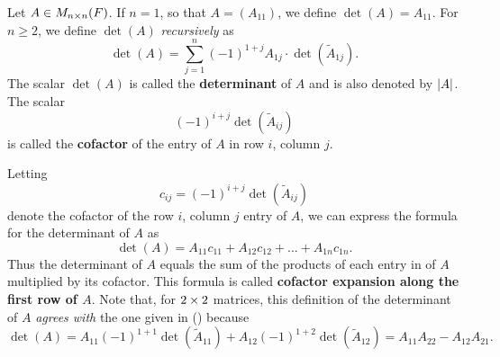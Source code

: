 \begin{definition} \label{def 4.2}
Let \(A \in M_{n \times n}(F)\).
If \(n = 1\), so that \(A = (A_{11})\), we define \(\det(A) = A_{11}\).
For \(n \ge 2\), we define \(\det(A)\) \emph{recursively} as
\[
    \det(A) = \sum_{j = 1}^n (-1)^{1 + j} A_{1j} \cdot \det( \tilde{A}_{1j}).
\]
The scalar \(\det(A)\) is called the \textbf{determinant} of \(A\) and is also denoted by \(\lvert A\rvert\).
The scalar
\[
    (-1)^{i + j} \det(\tilde{A}_{ij})
\]
is called the \textbf{cofactor} of the entry of \(A\) in row \(i\), column \(j\).
\end{definition}

\begin{remark} \label{remark 4.2.1}
Letting
\[
    c_{ij} = (-1)^{i + j} \det(\tilde{A}_{ij})
\]
denote the cofactor of the row \(i\), column \(j\) entry of \(A\),
we can express the formula for the determinant of \(A\) as
\[
    \det(A) = A_{11}c_{11} + A_{12}c_{12} + ... + A_{1n}c_{1n}.
\]
Thus the determinant of \(A\) equals the sum of the products of each entry in  of \(A\) multiplied by its cofactor.
This formula is called \textbf{cofactor expansion along the first row of \(A\)}.
Note that, for \(2 \times 2\) matrices, this definition of the determinant of \(A\) \emph{agrees with} the one given in () because
\[
    \det(A)= A_{11} (-1)^{1 + 1} \det(\tilde{A}_{11}) + A_{12}(-1)^{1 + 2} \det(\tilde{A}_{12}) = A_{11}A_{22} - A_{12}A_{21}.
\]
\end{remark}

